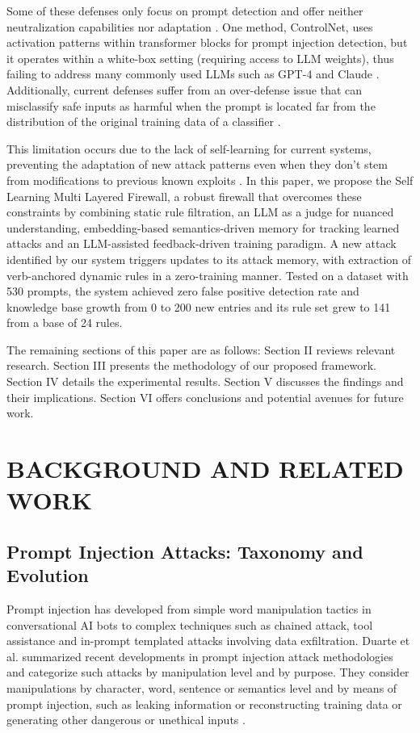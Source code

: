 \documentclass[10pt, conference, compsoc]{IEEEtran}
\begin{document}
Some of these defenses only focus on prompt detection and offer neither neutralization capabilities nor adaptation \cite{jacob2024promptshield}. One method, ControlNet, uses activation patterns within transformer blocks for prompt injection detection, but it operates within a white-box setting (requiring access to LLM weights), thus failing to address many commonly used LLMs such as GPT-4 and Claude \cite{yao2025controlnet}. Additionally, current defenses suffer from an over-defense issue that can misclassify safe inputs as harmful when the prompt is located far from the distribution of the original training data of a classifier \cite{chen2025detect_indirect}.

This limitation occurs due to the lack of self-learning for current systems, preventing the adaptation of new attack patterns even when they don't stem from modifications to previous known exploits \cite{jacob2024promptshield, yao2025controlnet, chen2025detect_indirect}. In this paper, we propose the Self Learning Multi Layered Firewall, a robust firewall that overcomes these constraints by combining static rule filtration, an LLM as a judge for nuanced understanding, embedding-based semantics-driven memory for tracking learned attacks and an LLM-assisted feedback-driven training paradigm. A new attack identified by our system triggers updates to its attack memory, with extraction of verb-anchored dynamic rules in a zero-training manner. Tested on a dataset with 530 prompts, the system achieved zero false positive detection rate and knowledge base growth from 0 to 200 new entries and its rule set grew to 141 from a base of 24 rules.

The remaining sections of this paper are as follows: Section II reviews relevant research. Section III presents the methodology of our proposed framework. Section IV details the experimental results. Section V discusses the findings and their implications. Section VI offers conclusions and potential avenues for future work.

\section{BACKGROUND AND RELATED WORK}

\subsection{Prompt Injection Attacks: Taxonomy and Evolution}

Prompt injection has developed from simple word manipulation tactics in conversational AI bots to complex techniques such as chained attack, tool assistance and in-prompt templated attacks involving data exfiltration. Duarte et al. summarized recent developments in prompt injection attack methodologies and categorize such attacks by manipulation level and by purpose. They consider manipulations by character, word, sentence or semantics level and by means of prompt injection, such as leaking information or reconstructing training data or generating other dangerous or unethical inputs \cite{duarte2026promptinjection}.
\end{document}
